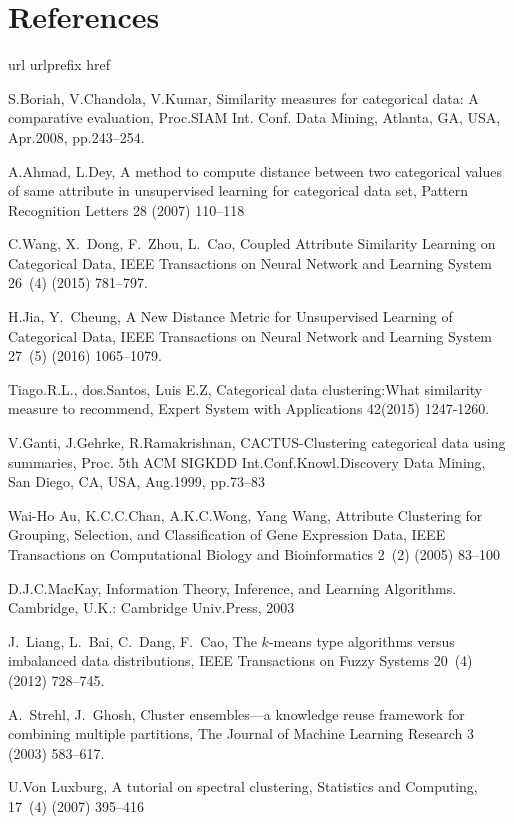 \documentclass[review]{elsarticle}
\begin{document}
\section*{References}
%
\begin{thebibliography}{10}
\expandafter\ifx\csname url\endcsname\relax
  \def\url#1{\texttt{#1}}\fi
\expandafter\ifx\csname urlprefix\endcsname\relax\def\urlprefix{URL }\fi
\expandafter\ifx\csname href\endcsname\relax
  \def\href#1#2{#2} \def\path#1{#1}\fi


S.Boriah, V.Chandola, V.Kumar, Similarity measures for categorical data: A comparative evaluation, Proc.SIAM Int. Conf. Data Mining, Atlanta, GA, USA, Apr.2008, pp.243--254.

A.Ahmad, L.Dey, A method to compute distance between two categorical values of same attribute in unsupervised learning for categorical data set, Pattern Recognition Letters 28 (2007) 110--118

C.Wang, X.~Dong, F.~Zhou, L.~Cao, Coupled Attribute Similarity Learning on Categorical Data, IEEE Transactions on Neural Network and Learning System 26~(4) (2015) 781--797.

H.Jia, Y.~Cheung, A New Distance Metric for Unsupervised Learning of Categorical Data, IEEE Transactions on Neural Network and Learning System 27~(5) (2016) 1065--1079.

Tiago.R.L., dos.Santos, Luis E.Z, Categorical data clustering:What similarity measure to recommend, Expert System with Applications 42(2015) 1247-1260.

V.Ganti, J.Gehrke, R.Ramakrishnan, CACTUS-Clustering categorical data using summaries, Proc. 5th ACM SIGKDD Int.Conf.Knowl.Discovery Data Mining, San Diego, CA, USA, Aug.1999, pp.73--83

Wai-Ho Au, K.C.C.Chan, A.K.C.Wong, Yang Wang, Attribute Clustering for Grouping, Selection, and Classification of Gene Expression Data, IEEE Transactions on Computational Biology and Bioinformatics 2~(2) (2005) 83--100

D.J.C.MacKay, Information Theory, Inference, and Learning Algorithms. Cambridge, U.K.: Cambridge Univ.Press, 2003

J.~Liang, L.~Bai, C.~Dang, F.~Cao, The $k$-means type algorithms versus imbalanced data distributions, IEEE Transactions on Fuzzy Systems 20~(4) (2012) 728--745.

A.~Strehl, J.~Ghosh, Cluster ensembles---a knowledge reuse framework for combining multiple partitions, The Journal of Machine Learning Research 3 (2003) 583--617.

U.Von Luxburg, A tutorial on spectral clustering, Statistics and Computing, 17~(4) (2007) 395--416

\end{thebibliography}
\end{document}

